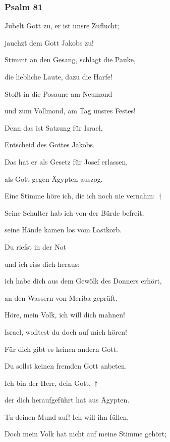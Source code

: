 \subsubsection{Psalm 81}

\noindent Jubelt Gott zu, er ist unsre Zuflucht;~\GreStar{}~\nopagebreak

jauchzt dem Gott Jakobs zu!

\noindent Stimmt an den Gesang, schlagt die Pauke,~\GreStar{}~\nopagebreak

die liebliche Laute, dazu die Harfe! 

\noindent Stoßt in die Posaune am Neumond~\GreStar{}~\nopagebreak

und zum Vollmond, am Tag unsres Festes!

\noindent Denn das ist Satzung für Israel,~\GreStar{}~\nopagebreak

Entscheid des Gottes Jakobs.

\noindent Das hat er als Gesetz für Josef erlassen,~\GreStar{}~\nopagebreak

als Gott gegen Ägypten auszog.

\noindent Eine Stimme höre ich, die ich noch nie vernahm:~†~\nopagebreak

Seine Schulter hab ich von der Bürde befreit,~\GreStar{}~\nopagebreak

seine Hände kamen los vom Lastkorb.

\noindent Du riefst in der Not~\GreStar{}~\nopagebreak

und ich riss dich heraus;

\noindent ich habe dich aus dem Gewölk des Donners erhört,~\GreStar{}~\nopagebreak

an den Wassern von Meríba geprüft.

\noindent Höre, mein Volk, ich will dich mahnen!~\GreStar{}~\nopagebreak

Israel, wolltest du doch auf mich hören!

\noindent Für dich gibt es keinen andern Gott.~\GreStar{}~\nopagebreak

Du sollst keinen fremden Gott anbeten.

\noindent Ich bin der Herr, dein Gott,~†~\nopagebreak

der dich heraufgeführt hat aus Ägypten.~\GreStar{}~\nopagebreak

Tu deinen Mund auf! Ich will ihn füllen.

\noindent Doch mein Volk hat nicht auf meine Stimme gehört;~\GreStar{}~\nopagebreak

